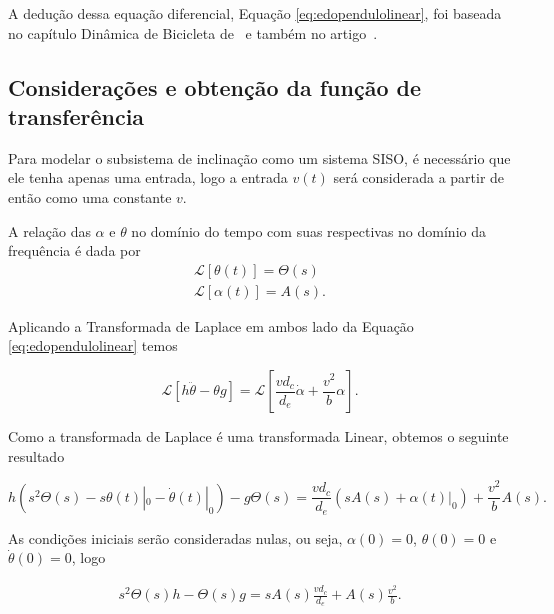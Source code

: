             A dedução dessa equação diferencial, Equação \ref{eq:edopendulolinear}, foi baseada no capítulo Dinâmica de Bicicleta de~\cite{book:astom} e também no artigo~\cite{article:astom}.
            
        \subsection{Considerações e obtenção da função de transferência}
        
            Para modelar o subsistema de inclinação como um sistema SISO, é necessário que ele tenha apenas uma entrada, logo a entrada $v(t)$ será considerada a partir de então como uma constante $v$.
        
            A relação das $\alpha$ e $\theta$ no domínio do tempo com suas respectivas no domínio da frequência é dada por 
            \begin{eqnarray}
                \mathcal{L} [\theta(t)] = \Theta(s)   \nonumber \\
                \mathcal{L} [\alpha(t)] = A(s).
            \end{eqnarray}
            
            Aplicando a Transformada de Laplace em ambos lado da Equação \eqref{eq:edopendulolinear} temos
            
            \begin{equation}
                 \mathcal{L} [h \ddot \theta -\theta g] = \mathcal{L} [\frac{vd_c}{d_e}\dot \alpha +\frac{v^2}{b}\alpha].
            \end{equation}
            
            Como a transformada de Laplace é uma transformada Linear, obtemos o seguinte resultado
            
            \begin{equation}
                h(s^2\Theta(s) - s\theta(t)|_0 - \dot\theta(t)|_0) - g\Theta(s) = \frac{vd_c}{d_e} (sA(s) + \alpha(t)|_0) + \frac{v^2}{b}A(s).
            \end{equation}
            
            As condições iniciais serão consideradas nulas, ou seja, $\alpha(0) = 0$, $\theta(0) = 0$ e $\dot\theta(0)=0$, logo
            
            \begin{eqnarray}
                s^2\Theta(s)h - \Theta(s)g = sA(s)\frac{vd_c}{d_e} + A(s)\frac{v^2}{b}.
            \end{eqnarray}
            
